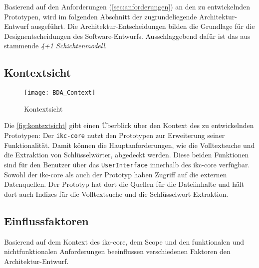 
Basierend auf den Anforderungen (\autoref{sec:anforderungen}) an den zu entwickelnden Prototypen, wird im folgenden Abschnitt der zugrundeliegende Architektur-Entwurf ausgeführt. Die Ar\-chi\-tek\-tur-\-Ent\-schei\-dung\-en bilden die Grundlage für die Designentscheidungen des Soft\-wa\-re-\-Ent\-wurfs. Ausschlaggebend dafür ist das aus \cite{kruchten1995architectural} stammende \textit{4+1 Schichtenmodell}.




\subsection{Kontextsicht}
    \begin{figure}[ht]
    \centering
    \texttt{[image: BDA\_Context]}
    \caption{Kontextsicht}
    \label{fig:kontextsicht}
    \end{figure}
 
 Die \autoref{fig:kontextsicht} gibt einen Überblick über den Kontext des zu entwickelnden Prototypen:
 Der \texttt{ikc-core} nutzt den Prototypen zur Erweiterung seiner Funktionalität. Damit können die Hauptanforderungen, wie die Volltextsuche und die Extraktion von Schlüsselwörter, abgedeckt werden. Diese beiden Funktionen sind für den Benutzer über das \texttt{UserInterface} innerhalb des \gls{ikc-core} verfügbar. Sowohl der \gls{ikc-core} als auch der Prototyp haben Zugriff auf die externen Datenquellen. Der Prototyp hat dort die Quellen für die Dateiinhalte und hält dort auch Indizes für die Volltextsuche und die Schlü\-ssel\-wort-Ex\-trak\-tion.
 



\subsection{Einflussfaktoren}\label{einflussfaktoren}


Basierend auf dem Kontext des \gls{ikc-core}, dem Scope und den funktionalen und nichtfunktionalen Anforderungen beeinflussen verschiedenen Faktoren den Architektur-Entwurf.

